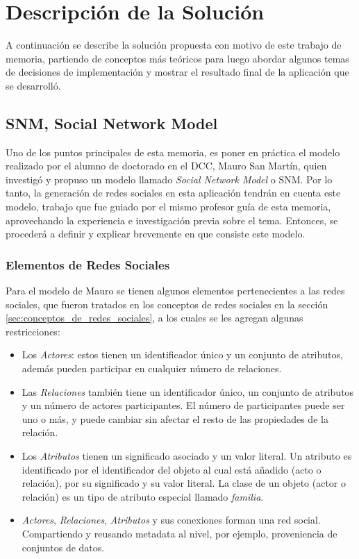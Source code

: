 \chapter{Descripción de la Solución}
\label{chap:descripcion_solucion}

A continuación se describe la solución propuesta con motivo de este trabajo de memoria, partiendo de conceptos más teóricos para luego abordar algunos temas de decisiones de implementación y mostrar el resultado final de la aplicación que se desarrolló.

\section{SNM, Social Network Model} %
\label{sec:snm_social_network_model}

Uno de los puntos principales de esta memoria, es poner en práctica el modelo realizado por el alumno de doctorado en el DCC, Mauro San Martín\cite{tesismauro}, quien investigó y propuso un modelo llamado \emph{Social Network Model} o SNM. Por lo tanto, la generación de redes sociales en esta aplicación tendrán en cuenta este modelo, trabajo que fue guiado por el mismo profesor guía de esta memoria, aprovechando la experiencia e investigación previa sobre el tema. Entonces, se procederá a definir y explicar brevemente en que consiste este modelo.

\subsection{Elementos de Redes Sociales} %
\label{sub:elementos_de_redes_sociales}

Para el modelo de Mauro se tienen algunos elementos pertenecientes a las redes sociales, que fueron tratados en los conceptos de redes sociales en la sección \ref{sec:conceptos_de_redes_sociales}, a los cuales se les agregan algunas restricciones:

  \begin{itemize}
    \item Los \emph{Actores}: estos tienen un identificador único y un conjunto de atributos, además pueden participar en cualquier número de relaciones.
    \item Las \emph{Relaciones} también tiene un identificador único, un conjunto de atributos y un número de actores participantes. El número de participantes puede ser uno o más, y puede cambiar sin afectar el resto de las propiedades de la relación.
    \item Los \emph{Atributos} tienen un significado asociado y un valor literal. Un atributo es identificado por el identificador del objeto al cual está añadido (acto o relación), por su significado y su valor literal. La clase de un objeto (actor o relación) es un tipo de atributo especial llamado \emph{familia}.
    \item \emph{Actores}, \emph{Relaciones}, \emph{Atributos} y sus conexiones forman una red social. Compartiendo y reusando metadata al nivel, por ejemplo, proveniencia de conjuntos de datos.
  \end{itemize}
  
